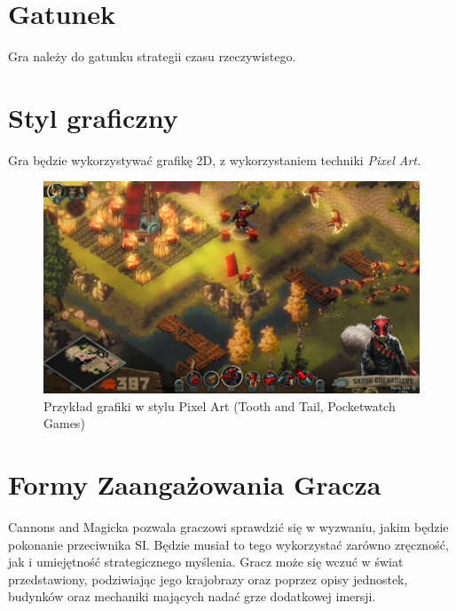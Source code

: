 \documentclass[a4paper]{scrreprt}
\def \GameTiTle{Cannons and Magicka}
\begin{document}
\section{Gatunek}
Gra należy do gatunku strategii czasu rzeczywistego.
\section{Styl graficzny}
Gra będzie wykorzystywać grafikę 2D, z wykorzystaniem techniki \emph{Pixel Art.}

\begin{figure}[hb]
\centering
\includegraphics[width=1\textwidth]{ToothAndTail.png}
\caption{\label{fig:arteg1} Przykład grafiki w stylu Pixel Art (Tooth and Tail, Pocketwatch Games)}
\end{figure}



\section{Formy Zaangażowania Gracza}
\GameTiTle{} pozwala graczowi sprawdzić się w wyzwaniu, jakim będzie pokonanie przeciwnika SI. Będzie musiał to tego wykorzystać zarówno zręczność, jak i umiejętność strategicznego myślenia. Gracz może się wczuć w świat przedstawiony, podziwiając jego krajobrazy oraz poprzez opisy jednostek, budynków oraz mechaniki mających nadać grze dodatkowej imersji.
\end{document}
